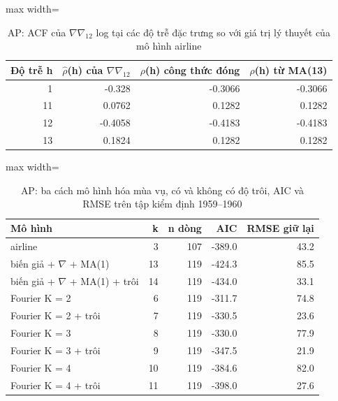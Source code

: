 \begin{table}[H]
\centering\footnotesize
\caption{AP: ACF của $\nabla\nabla_{12}$ log tại các độ trễ đặc trưng so với giá trị lý thuyết của mô hình airline}\label{tab:tab_b12_10_airline_acf}
\begin{adjustbox}{max width=\linewidth}
\begin{tabular}{|r|r|r|r|}
\toprule
Độ trễ h & $\hat{\rho}$(h) của $\nabla\nabla_{12}$ & $\rho$(h) công thức đóng & $\rho$(h) từ MA(13) \\
\midrule
1 & -0.328 & -0.3066 & -0.3066 \\
11 & 0.0762 & 0.1282 & 0.1282 \\
12 & -0.4058 & -0.4183 & -0.4183 \\
13 & 0.1824 & 0.1282 & 0.1282 \\
\bottomrule
\end{tabular}
\end{adjustbox}
\end{table}
\begin{table}[H]
\centering\footnotesize
\caption{AP: ba cách mô hình hóa mùa vụ, có và không có độ trôi, AIC và RMSE trên tập kiểm định 1959--1960}\label{tab:tab_b12_10_seasonality_models}
\begin{adjustbox}{max width=\linewidth}
\begin{tabular}{|>{\raggedright\arraybackslash}p{}|r|r|r|r|}
\toprule
Mô hình & k & n dòng & AIC & RMSE giữ lại \\
\midrule
airline & 3 & 107 & -389.0 & 43.2 \\[3pt]
11 biến giả + $\nabla$ + MA(1) & 13 & 119 & -424.3 & 85.5 \\[3pt]
11 biến giả + $\nabla$ + MA(1) + trôi & 14 & 119 & -434.0 & 33.1 \\[3pt]
Fourier K = 2 & 6 & 119 & -311.7 & 74.8 \\[3pt]
Fourier K = 2 + trôi & 7 & 119 & -330.5 & 23.6 \\[3pt]
Fourier K = 3 & 8 & 119 & -330.0 & 77.9 \\[3pt]
Fourier K = 3 + trôi & 9 & 119 & -347.5 & 21.9 \\[3pt]
Fourier K = 4 & 10 & 119 & -384.6 & 82.0 \\[3pt]
Fourier K = 4 + trôi & 11 & 119 & -398.0 & 27.6 \\[3pt]
\bottomrule
\end{tabular}
\end{adjustbox}\par{}
\end{table}
